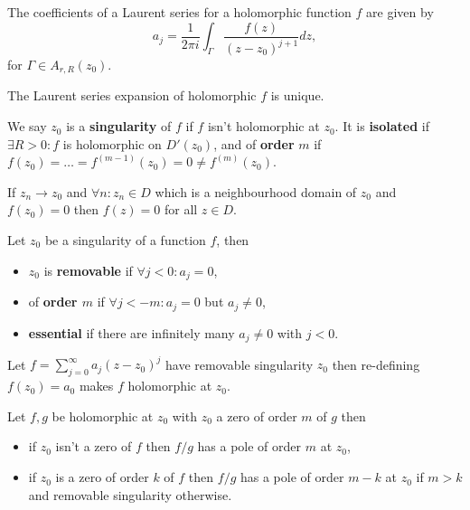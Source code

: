 \begin{multicols}{2}
\begin{theorem}
The coefficients of a Laurent series for a holomorphic function $f$ are given by
    \[
    a_j = \frac{1}{2\pi i}\int_\Gamma \frac{f(z)}{(z-z_0)^{j+1}}dz,
    \]
for $\Gamma\in A_{r,R}(z_0)$.
\end{theorem}

\begin{theorem}[4.4.7]
The Laurent series expansion of holomorphic $f$ is unique.
\end{theorem}

\begin{definition}
We say $z_0$ is a \textbf{singularity} of $f$ if $f$ isn't holomorphic at $z_0$. It is \textbf{isolated} if $\exists R>0: f$ is holomorphic on $D'(z_0)$, and of \textbf{order} $m$ if $f(z_0)=\dots=f^{(m-1)}(z_0)=0\neq f^{(m)}(z_0)$.
\end{definition}

\begin{theorem}[4.5.5]
If $z_n\to z_0$ and $\forall n: z_n\in D$ which is a neighbourhood domain of $z_0$ and $f(z_0)=0$ then $f(z)=0$ for all $z\in D$. 
\end{theorem}

\begin{definition}
Let $z_0$ be a singularity of a function $f$, then
    \begin{itemize}
        \item{$z_0$ is \textbf{removable} if $\forall j<0: a_j=0$,}
        \item{of \textbf{order $m$} if $\forall j<-m:a_j=0$ but $a_j\neq0$,}
        \item{\textbf{essential} if there are infinitely many $a_j\neq0$ with $j<0$.}
    \end{itemize}
\end{definition}

\begin{theorem}[4.5.8]
Let $f=\sum_{j=0}^\infty a_j(z-z_0)^j$ have removable singularity $z_0$ then re-defining $f(z_0)=a_0$ makes $f$ holomorphic at $z_0$. 
\end{theorem}

\begin{theorem}[4.5.11]
Let $f,g$ be holomorphic at $z_0$ with $z_0$ a zero of order $m$ of $g$ then
  \begin{itemize}
      \item{if $z_0$ isn't a zero of $f$ then $f/g$ has a pole of order $m$ at $z_0$,}
      \item{if $z_0$ is a zero of order $k$ of $f$ then $f/g$ has a pole of order $m-k$ at $z_0$ if $m>k$ and removable singularity otherwise.}
  \end{itemize}
\end{theorem}


\end{multicols}
